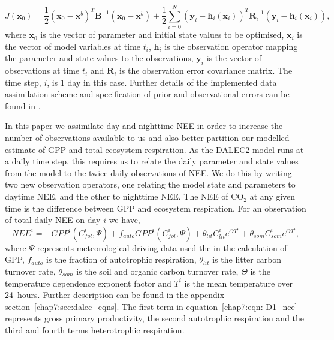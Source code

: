\begin{equation}
J(\textbf{x}_0) = \frac{1}{2}(\textbf{x}_0-\textbf{x}^b)^{T}\textbf{B}^{-1}(\textbf{x}_0-\textbf{x}^b)+\frac{1}{2}\sum_{i=0}^{N}(\textbf{y}_i-\textbf{h}_i(\textbf{x}_i))^{T}\textbf{R}_{i}^{-1}(\textbf{y}_i-\textbf{h}_i(\textbf{x}_i)),
\end{equation}
where $\textbf{x}_{0}$ is the vector of parameter and initial state values to be optimised, $\textbf{x}_{i}$ is the vector of model variables at time \(t_{i}\), $\textbf{h}_{i}$ is the observation operator mapping the parameter and state values to the observations, $\textbf{y}_{i}$ is the vector of observations at time \(t_i\) and $\textbf{R}_{i}$ is the observation error covariance matrix. The time step, \(i\), is 1 day in this case. Further details of the implemented data assimilation scheme and specification of prior and observational errors can be found in \citet{Pinnington2016299}. 

In this paper we assimilate day and nighttime NEE in order to increase the number of observations available to us and also better partition our modelled estimate of GPP and total ecosystem respiration. As the DALEC2 model runs at a daily time step, this requires us to relate the daily parameter and state values from the model to the twice-daily observations of NEE. We do this by writing two new observation operators, one relating the model state and parameters to daytime NEE, and the other to nighttime NEE. The NEE of CO\(_{2}\) at any given time is the difference between GPP and ecosystem respiration. For an observation of total daily NEE on day \(i\) we have,
\begin{equation}
NEE^{i}=-GPP^{i}(C_{fol}^{i}, \Psi) +f_{auto}GPP^{i}(C_{fol}^{i}, \Psi) + \theta_{lit}C_{lit}^i e^{\Theta T^{i}} + \theta_{som}C_{som}^i e^{\Theta T^{i}}, \label{chap7:eqn: D1_nee}
\end{equation}
where \(\Psi\) represents meteorological driving data used the in the calculation of GPP, \(f_{auto}\) is the fraction of autotrophic respiration, \(\theta_{lit}\) is the litter carbon turnover rate, \(\theta_{som}\) is the soil and organic carbon turnover rate, \(\Theta\) is the temperature dependence exponent factor and \(T^{i}\) is the mean temperature over 24~hours. Further description can be found in the appendix section~\ref{chap7:sec:dalec_eqns}. The first term in equation~\eqref{chap7:eqn: D1_nee} represents gross primary productivity, the second autotrophic respiration and the third and fourth terms heterotrophic respiration. 

